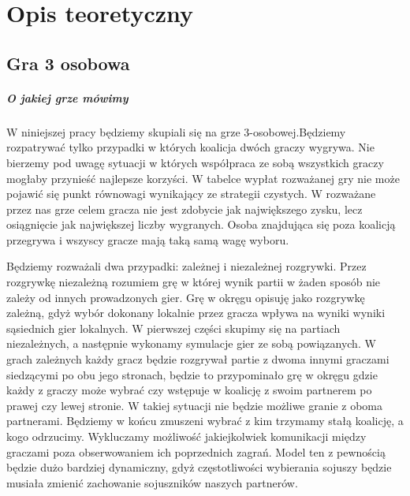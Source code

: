 \chapter{Opis teoretyczny}
\label{cha:opis_teor}

\section{Gra 3 osobowa}
\label{sec:3_gra}

\paragraph{O jakiej grze mówimy}

W niniejszej pracy będziemy skupiali się na grze 3-osobowej.Będziemy rozpatrywać tylko przypadki w których koalicja dwóch graczy wygrywa. Nie bierzemy pod uwagę sytuacji w których współpraca ze sobą wszystkich graczy mogłaby przynieść najlepsze korzyści. W tabelce wypłat rozważanej gry nie może pojawić się punkt równowagi wynikający ze strategii czystych. W rozważane przez nas grze celem gracza nie jest zdobycie jak największego zysku, lecz osiągnięcie jak największej liczby wygranych. Osoba znajdująca się poza koalicją przegrywa i wszyscy gracze mają taką samą wagę wyboru.

Będziemy rozważali dwa przypadki: zależnej i niezależnej rozgrywki. Przez rozgrywkę niezależną rozumiem grę w której wynik partii w żaden sposób nie zależy od innych prowadzonych gier. Grę w okręgu opisuję jako rozgrywkę zależną, gdyż wybór dokonany lokalnie przez gracza wpływa na wyniki wyniki sąsiednich gier lokalnych. W pierwszej części skupimy się na partiach niezależnych, a następnie wykonamy symulacje gier ze sobą powiązanych. W grach zależnych każdy gracz będzie rozgrywał partie z dwoma innymi graczami siedzącymi po obu jego stronach, będzie to przypominało grę w okręgu gdzie każdy z graczy może wybrać czy wstępuje w koalicję z swoim partnerem po prawej czy lewej stronie. W takiej sytuacji nie będzie możliwe granie z oboma partnerami. Będziemy w końcu zmuszeni wybrać z kim trzymamy stałą koalicję, a kogo odrzucimy. Wykluczamy możliwość jakiejkolwiek komunikacji między graczami poza obserwowaniem ich poprzednich zagrań. Model ten z pewnością będzie dużo bardziej dynamiczny, gdyż częstotliwości wybierania sojuszy będzie musiała zmienić zachowanie sojuszników naszych partnerów.

